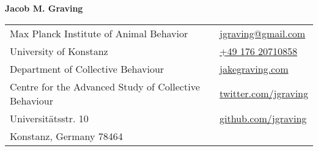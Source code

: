 \documentclass[letterpaper,7pt,oneside]{article}
\begin{document}

\hspace{1mm} \LARGE{\textbf{Jacob M. Graving}}  \\
\normalsize



\begin{center}
\begin{tabular}{l l}
 Max Planck Institute of Animal Behavior		& \hspace{2in} \href{mailto:jgraving@gmail.com}{\faEnvelope{ } jgraving@gmail.com} \\
 University of Konstanz		& \hspace{2in}   \href{tel:+4917620710858 }{\faPhone{ } +49 176 20710858 }  \\
 Department of Collective Behaviour     & \hspace{2in}  \href{http://jakegraving.com/}{\faGlobe{ } jakegraving.com}   \\
 Centre for the Advanced Study of Collective Behaviour & \hspace{2in}  \href{https://twitter.com/jgraving}{\faTwitter{ }  twitter.com/jgraving}   \\
 Universit\"{a}tsstr. 10             & \hspace{2in} \href{https://github.com/jgraving}{\faGithub{ }  github.com/jgraving} \\
Konstanz, Germany 78464 
\end{tabular}
\end{center}
\end{document}
